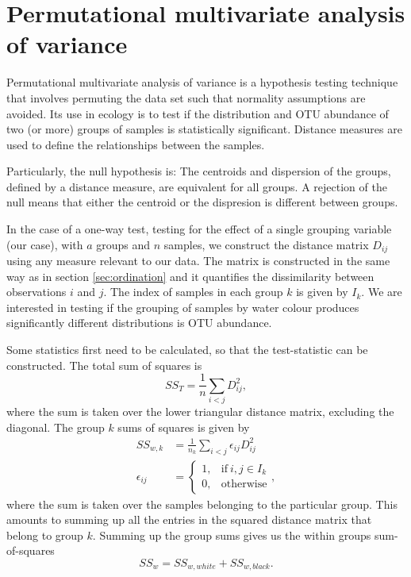 \section{Permutational multivariate analysis of variance
}
\label{sec:permanova}

Permutational multivariate analysis of variance is a hypothesis testing technique that involves permuting the data set such that normality assumptions are avoided. Its use in ecology is to test if the distribution and OTU abundance of two (or more) groups of samples is statistically significant. Distance measures are used to define the relationships between the samples.

Particularly, the null hypothesis is: The centroids and dispersion of the groups, defined by a distance measure, are equivalent for all groups.
A rejection of the null means that either the centroid or the dispresion is different between groups.

In the case of a one-way test, testing for the effect of a single grouping variable (our case), with $a$ groups and $n$ samples, we construct the distance matrix $D_{ij}$ using any measure relevant to our data. The matrix is constructed in the same way as in section \ref{sec:ordination} and it quantifies the dissimilarity between observations $i$ and $j$. The index of samples in each group $k$ is given by $I_{k}$. We are interested in testing if the grouping of samples by water colour produces significantly different distributions is OTU abundance.

Some statistics first need to be calculated, so that the test-statistic can be constructed. The total sum of squares is 
\begin{equation}
	SS_T = \frac{1}{n}\sum_{i<j} D_{ij}^2,
\end{equation}
where the sum is taken over the lower triangular distance matrix, excluding the diagonal. The group $k$ sums of squares is given by
\begin{align}
	SS_{w,k} &=\frac{1}{n_k} \sum_{i<j} \epsilon_{ij} D_{ij}^2 \\
	\epsilon_{ij} &=
	 \begin{cases}
	1, & \text{if}\ i,j \in I_{k} \\
	0, & \text{otherwise}
	\end{cases},
\end{align}
where the sum is taken over the samples belonging to the particular group. This amounts to summing up all the entries in the squared distance matrix that belong to group $k$. Summing up the group sums gives us the within groups sum-of-squares
\begin{equation}
	SS_w = SS_{w,white} + SS_{w,black}.
\end{equation}

